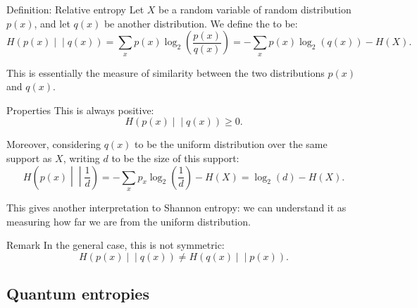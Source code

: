 \documentclass[a4paper]{article}
\begin{document}
\begin{parag}{Definition: Relative entropy}
    Let $X$ be a random variable of random distribution $p\left(x\right)$, and let $q\left(x\right)$ be another distribution. We define the  to be: 
    \[H\left(p\left(x\right) \middle|\middle| q\left(x\right)\right) = \sum_{x} p\left(x\right) \log_{2}\left(\frac{p\left(x\right)}{q\left(x\right)}\right) = -\sum_{x} p\left(x\right) \log_{2}\left(q\left(x\right)\right) - H\left(X\right).\]

    This is essentially  the measure of similarity between the two distributions $p\left(x\right)$ and $q\left(x\right)$.

    \begin{subparag}{Properties}
        This is always positive: 
        \[H\left(p\left(x\right) \middle|\middle| q\left(x\right)\right) \geq 0.\]
        
        Moreover, considering $q\left(x\right)$ to be the uniform distribution over the same support as $X$, writing $d$ to be the size of this support: 
        \[H\left(p\left(x\right) \middle|\middle| \frac{1}{d}\right) = -\sum_{x} p_x \log_{2}\left(\frac{1}{d}\right) - H\left(X\right) = \log_{2}\left(d\right) - H\left(X\right).\]

        This gives another interpretation to Shannon entropy: we can understand it as measuring how far we are from the uniform distribution.
    \end{subparag}

    \begin{subparag}{Remark}
        In the general case, this is not symmetric: 
        \[H\left(p\left(x\right) \middle|\middle| q\left(x\right)\right) \neq H\left(q\left(x\right) \middle|\middle| p\left(x\right)\right).\]
    \end{subparag}
\end{parag}

\subsection{Quantum entropies}
\end{document}
